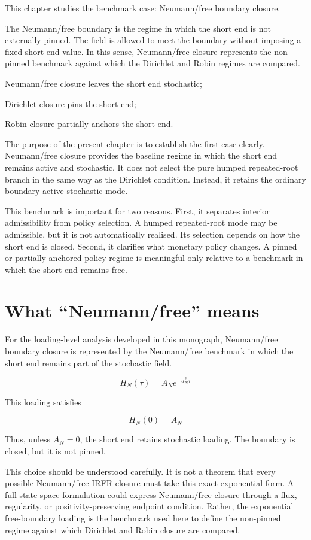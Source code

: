 \documentclass[11pt,oneside]{book}
\begin{document}
This chapter studies the benchmark case: Neumann/free boundary
closure.

The Neumann/free boundary is the regime in which the short end is not
externally pinned. The field is allowed to meet the boundary without
imposing a fixed short-end value. In this sense, Neumann/free closure
represents the non-pinned benchmark against which the Dirichlet and
Robin regimes are compared.

Neumann/free closure leaves the short end stochastic;

Dirichlet closure pins the short end;

Robin closure partially anchors the short end.

The purpose of the present chapter is to establish the first case
clearly. Neumann/free closure provides the baseline regime in which the short
end remains active and stochastic. It does not select the pure humped
repeated-root branch in the same way as the Dirichlet condition.
Instead, it retains the ordinary boundary-active stochastic mode.

This benchmark is important for two reasons. First, it separates
interior admissibility from policy selection. A humped repeated-root
mode may be admissible, but it is not automatically realised. Its
selection depends on how the short end is closed. Second, it clarifies
what monetary policy changes. A pinned or partially anchored policy
regime is meaningful only relative to a benchmark in which the short end
remains free.

\section{What ``Neumann/free'' means}\label{what-natural-means}

For the loading-level analysis developed in this monograph, Neumann/free
boundary closure is represented by the Neumann/free benchmark in which
the short end remains part of the stochastic field.

\[
H_N(\tau) = A_N e^{-a_N^2\tau}
\]

This loading satisfies

\[
H_N(0) = A_N
\]

Thus, unless $A_N=0$, the short end retains stochastic loading. The
boundary is closed, but it is not pinned.

This choice should be understood carefully. It is not a theorem that
every possible Neumann/free IRFR closure must take this exact exponential
form. A full state-space formulation could express Neumann/free closure
through a flux, regularity, or positivity-preserving endpoint condition.
Rather, the exponential free-boundary loading is the benchmark used here
to define the non-pinned regime against which Dirichlet and Robin
closure are compared.
\end{document}
